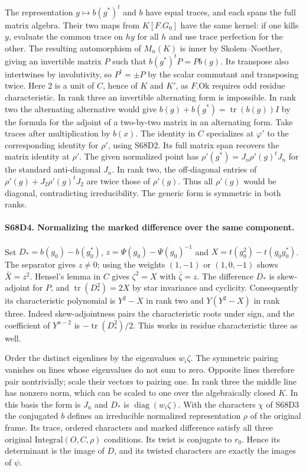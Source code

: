 The representation $g\mapsto b(g^*)^t$ and $b$ have equal
traces, and each spans the full matrix algebra. Their two maps
from $K[F.G_0]$ have the same kernel: if one kills $y$, evaluate
the common trace on $hy$ for all $h$ and use trace perfection
for the other. The resulting automorphism of $M_n(K)$ is inner by
Skolem--Noether, giving an invertible matrix $P$ such that
$b(g^*)^tP=P b(g)$. Its transpose also intertwines by involutivity,
so $P^t=\pm P$ by the scalar commutant and transposing twice.
Here $2$ is a unit of $C$, hence of $K$ and $K'$, as $F.\mathrm{Ok}$
requires odd residue characteristic. In rank three an invertible
alternating form is impossible. In rank two the alternating
alternative would give
$b(g)+b(g^*)=\operatorname{tr}(b(g))I$ by the formula for the
adjoint of a two-by-two matrix in an alternating form. Take traces
after multiplication by $b(x)$. The identity in $C$ specializes
at $\varphi'$ to the corresponding identity for $\rho'$, using
S68D2. Its full matrix span recovers the matrix identity at $\rho'$.
The given normalized point has
$\rho'(g^*)=J_n\rho'(g)^tJ_n$ for the standard anti-diagonal
$J_n$. In rank two, the off-diagonal entries of
$\rho'(g)+J_2\rho'(g)^tJ_2$ are twice those of $\rho'(g)$.
Thus all $\rho'(g)$ would be diagonal, contradicting irreducibility.
The generic form is symmetric in both ranks.

\paragraph{S68D4. Normalizing the marked difference over the same component.}
Set $D_* = b(g_0)-b(g_0^*)$, $z=\Psi(g_0)-\Psi(g_0)^{-1}$
and $X=t(g_0^2)-t(g_0g_0^*)$. The separator gives $z\ne0$;
using the weights $(1,-1)$ or $(1,0,-1)$ shows $\bar X=z^2$.
Hensel's lemma in $C$ gives $\zeta^2=X$ with $\bar\zeta=z$.
The difference $D_*$ is skew-adjoint for $P$, and
$\operatorname{tr}(D_*^2)=2X$ by star invariance and cyclicity.
Consequently its characteristic polynomial is $Y^2-X$ in rank
two and $Y(Y^2-X)$ in rank three. Indeed skew-adjointness pairs
the characteristic roots under sign, and the coefficient of
$Y^{n-2}$ is $-\operatorname{tr}(D_*^2)/2$. This works in
residue characteristic three as well.

Order the distinct eigenlines by the eigenvalues $w_i\zeta$.
The symmetric pairing vanishes on lines whose eigenvalues do
not sum to zero. Opposite lines therefore pair nontrivially;
scale their vectors to pairing one. In rank three the middle line
has nonzero norm, which can be scaled to one over the algebraically
closed $K$. In this basis the form is $J_n$ and $D_*$ is
$\operatorname{diag}(w_i\zeta)$. With the characters $\chi$ of
S68D3 the conjugated $b$ defines an irreducible normalized
representation $\rho$ of the original frame. Its trace, ordered
characters and marked difference satisfy all three original
$\mathrm{Integral}(O,C,\rho)$ conditions. Its twist is conjugate
to $r_0$. Hence its determinant is the image of $D$, and its
twisted characters are exactly the images of $\psi$.

